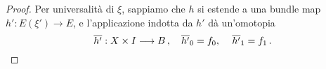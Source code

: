 \begin{thm}
\begin{proof}
		Per universalità di $\xi$, sappiamo che $h$ si estende a una bundle map $h':E(\xi') \to E$,
		e l'applicazione indotta da $h'$ dà un'omotopia
		\begin{equation*}
			\overline{h'} : X \times I \longrightarrow B\,,
			\quad \overline{h'}_{0} = f_{0},\, \quad \overline{h'}_{1} = f_{1}\,. \qedhere
		\end{equation*}
	\end{proof}
\end{thm}

